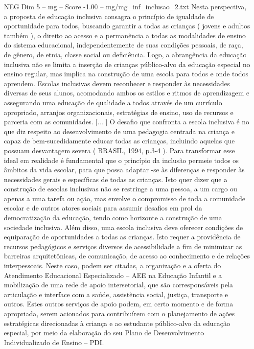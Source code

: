 \begin{textsample}{NEG Dim 5 – mg – Score -1.00 – mg/mg\_inf\_inclusao\_2.txt}  \label{ex:f5_neg_110}
Nesta perspectiva, a proposta de educação inclusiva consagra o princípio de igualdade de oportunidade para todos, buscando garantir a todas as crianças ( jovens e adultos também ), o direito ao acesso e a permanência a todas as modalidades de ensino do sistema educacional, independentemente de suas condições pessoais, de raça, de gênero, de etnia, classe social ou deficiência.
Logo, a abrangência da educação inclusiva não se limita a inserção de crianças público-alvo da educação especial no ensino regular, mas implica na construção de uma escola para todos e onde todos aprendem.
Escolas inclusivas devem reconhecer e responder às necessidades diversas de seus alunos, acomodando ambos os estilos e ritmos de aprendizagem e assegurando uma educação de qualidade a todos através de um currículo apropriado, arranjos organizacionais, estratégias de ensino, uso de recursos e parceria com as comunidades. [... ] O desafio que confronta a escola inclusiva é no que diz respeito ao desenvolvimento de uma pedagogia centrada na criança e capaz de bem-sucedidamente educar todas as crianças, incluindo aquelas que possuam desvantagem severa ( BRASIL, 1994, p.3-4 ).
Para transformar esse ideal em realidade é fundamental que o princípio da inclusão permeie todos os âmbitos da vida escolar, para que possa adaptar -se às diferenças e responder às necessidades gerais e específicas de todas as crianças.
Isto quer dizer que a construção de escolas inclusivas não se restringe a uma pessoa, a um cargo ou apenas a uma tarefa ou ação, mas envolve o compromisso de toda a comunidade escolar e de outros atores sociais para assumir desafios em prol da democratização da educação, tendo como horizonte a construção de uma sociedade inclusiva.
Além disso, uma escola inclusiva deve oferecer condições de equiparação de oportunidades a todas as crianças.
Isto requer a providência de recursos pedagógicos e serviços diversos de acessibilidade a fim de minimizar as barreiras arquitetônicas, de comunicação, de acesso ao conhecimento e de relações interpessoais.
Neste caso, podem ser citadas, a organização e a oferta do Atendimento Educacional Especializado – AEE na Educação Infantil e a mobilização de uma rede de apoio intersetorial, que são corresponsáveis pela articulação e interface com a saúde, assistência social, justiça, transporte e outros.
Estes outros serviços de apoio podem, em certo momento e de forma apropriada, serem acionados para contribuírem com o planejamento de ações estratégicas direcionadas à criança e ao estudante público-alvo da educação especial, por meio da elaboração do seu Plano de Desenvolvimento Individualizado de Ensino – PDI.

\end{textsample}
